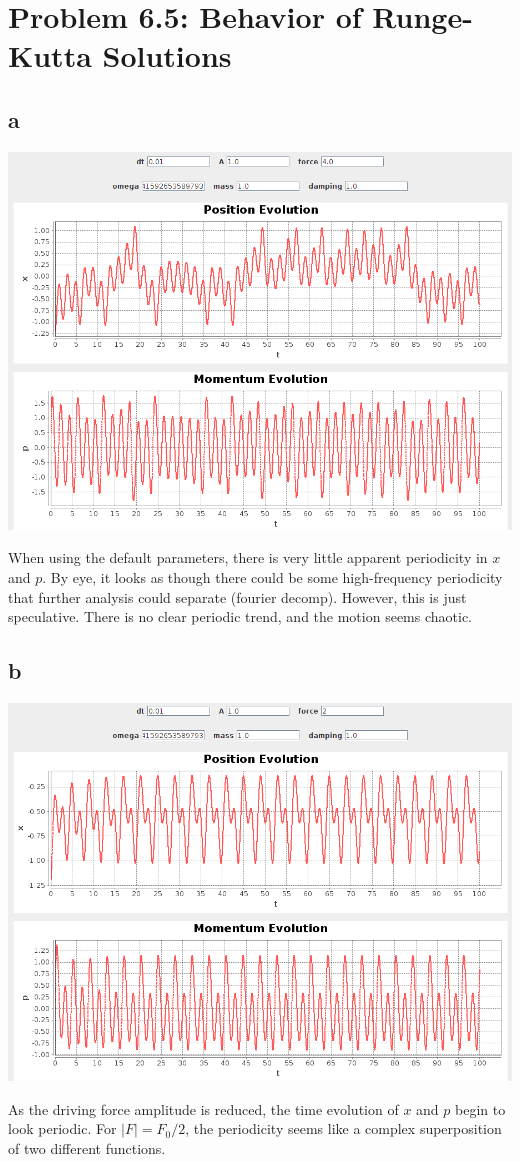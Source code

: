 \documentclass[aps,letterpaper,10pt]{article}
\begin{document}
\section{Problem 6.5: Behavior of Runge-Kutta Solutions}
\subsection*{a}
\begin{center}
\includegraphics[width=.6\textwidth]{../img/ChaoticInitial.png}
\end{center}

When using the default parameters, there is very little apparent periodicity in $x$ and $p$. By eye, it looks as though there could be some high-frequency periodicity that further analysis could separate (fourier decomp). However, this is just speculative. There is no clear periodic trend, and the motion seems chaotic.

\newpage
\subsection*{b}
\begin{center}
\includegraphics[width=.6\textwidth]{../img/Initialby2.png}
\end{center}
As the driving force amplitude is reduced, the time evolution of $x$ and $p$ begin to look periodic. For $|F| = F_0/2$, the periodicity seems like a complex superposition of two different functions.
\end{document}
